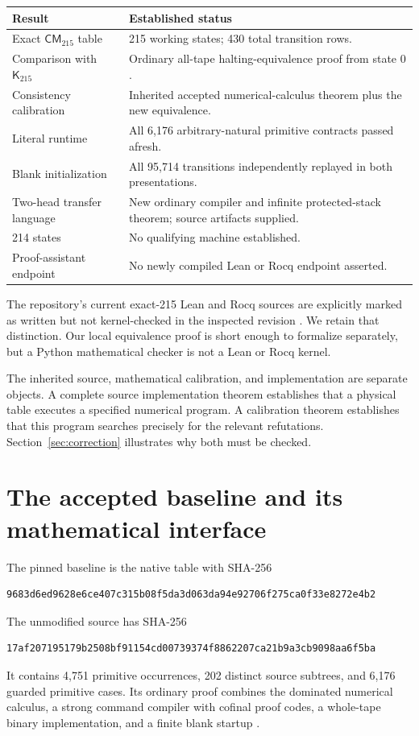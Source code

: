 \documentclass[11pt]{article}
\theoremstyle{definition}\newtheorem{definition}[theorem]{Definition}
\theoremstyle{remark}\newtheorem{remark}[theorem]{Remark}
\newcommand{\Kold}{\mathsf{K}_{215}}
\newcommand{\Knew}{\mathsf{CM}_{215}}
\begin{document}
\begin{center}
\begin{tabular}{p{}p{}}
\toprule
Result & Established status \\
\midrule
Exact $\Knew$ table & 215 working states; 430 total transition rows. \\
Comparison with $\Kold$ & Ordinary all-tape halting-equivalence proof from state $0$. \\
Consistency calibration & Inherited accepted numerical-calculus theorem plus the new equivalence. \\
Literal runtime & All 6,176 arbitrary-natural primitive contracts passed afresh. \\
Blank initialization & All 95,714 transitions independently replayed in both presentations. \\
Two-head transfer language & New ordinary compiler and infinite protected-stack theorem; source artifacts supplied. \\
214 states & No qualifying machine established. \\
Proof-assistant endpoint & No newly compiled Lean or Rocq endpoint asserted. \\
\bottomrule
\end{tabular}
\end{center}

The repository's current exact-215 Lean and Rocq sources are explicitly
marked as written but not kernel-checked in the inspected revision
\cite{K215}. We retain that distinction. Our local equivalence proof is
short enough to formalize separately, but a Python mathematical checker
is not a Lean or Rocq kernel.

The inherited source, mathematical calibration, and implementation are
separate objects. A complete source implementation theorem establishes
that a physical table executes a specified numerical program. A calibration
theorem establishes that this program searches precisely for the relevant
refutations. Section~\ref{sec:correction} illustrates why both must be
checked.

\section{The accepted baseline and its mathematical interface}
\label{sec:baseline}

The pinned baseline is the native table with SHA-256
\begin{lstlisting}
9683d6ed9628e6ce407c315b08f5da3d063da94e92706f275ca0f33e8272e4b2
\end{lstlisting}
The unmodified source has SHA-256
\begin{lstlisting}
17af207195179b2508bf91154cd00739374f8862207ca21b9a3cb9098aa6f5ba
\end{lstlisting}
It contains 4,751 primitive occurrences, 202 distinct source subtrees, and
6,176 guarded primitive cases. Its ordinary proof combines the dominated
numerical calculus, a strong command compiler with cofinal proof codes,
a whole-tape binary implementation, and a finite blank startup
\cite{K215proof,K215reproduction}.
\end{document}

